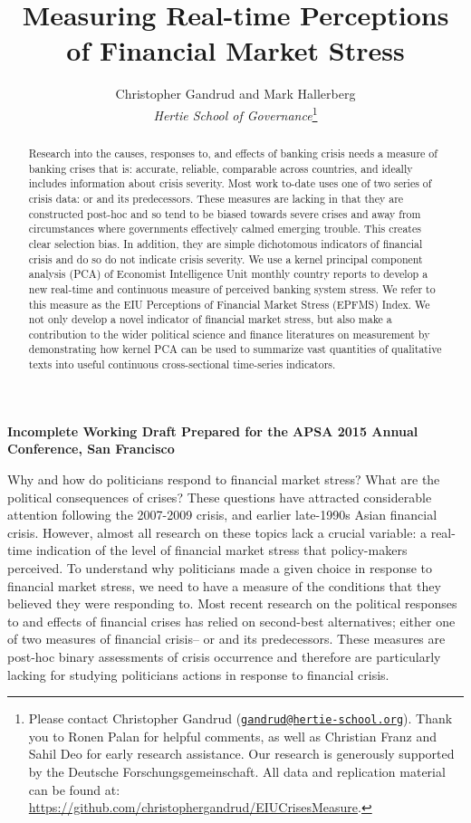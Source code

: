 \documentclass[]{article}
\title{Measuring Real-time Perceptions of Financial Market Stress}
\author{Christopher Gandrud and Mark Hallerberg \\ \emph{Hertie School of Governance}\footnote{Please contact Christopher Gandrud
(\href{mailto:gandrud@hertie-school.org}{\nolinkurl{gandrud@hertie-school.org}}).
Thank you to Ronen Palan for helpful comments, as well as Christian Franz and Sahil Deo for early research assistance. Our research is generously supported by the Deutsche Forschungsgemeinschaft. All data and replication material can be found at:
\url{https://github.com/christophergandrud/EIUCrisesMeasure}.}}
\begin{document}
\maketitle


\textbf{Incomplete Working Draft Prepared for the APSA 2015 Annual Conference, San Francisco}

\begin{abstract}
Research into the causes, responses to, and effects of banking crisis needs a measure of banking crises that is: accurate, reliable, comparable across countries, and ideally includes information about crisis severity. Most work to-date uses one of two series of crisis data: \cite{Reinhart2009,ReinhartRog2010} or \cite{laeven2013} and its predecessors. These measures are lacking in that they are constructed post-hoc and so tend to be biased towards severe crises and away from circumstances where governments effectively calmed emerging trouble. This creates clear selection bias. In addition, they are simple dichotomous indicators of financial crisis and do so do not indicate crisis severity. We use a kernel principal component analysis (PCA) of Economist Intelligence Unit monthly country reports to develop a new real-time and continuous measure of perceived banking system stress. We refer to this measure as the EIU Perceptions of Financial Market Stress (EPFMS) Index. We not only develop a novel indicator of financial market stress, but also make a contribution to the wider political science and finance literatures on measurement by demonstrating how kernel PCA can be used to summarize vast quantities of qualitative texts into useful continuous cross-sectional time-series indicators.
\end{abstract}

Why and how do politicians respond to financial market stress? What are the political consequences of crises? These questions have attracted considerable attention following the
2007-2009 crisis, and earlier late-1990s Asian financial crisis. However, almost all research on these topics lack a crucial variable: a real-time indication of the level of financial
market stress that policy-makers perceived. To understand why politicians made a given choice in response to financial market stress, we need to have a measure of the conditions that they believed they were responding to. Most recent research on the political responses to and effects of financial crises has relied on second-best alternatives; either one of two measures of financial crisis--\cite{Reinhart2009,ReinhartRog2010} or \cite{laeven2013} and its predecessors. These measures are post-hoc binary assessments of crisis occurrence and therefore are particularly lacking for studying politicians actions in response to financial crisis.
\end{document}
